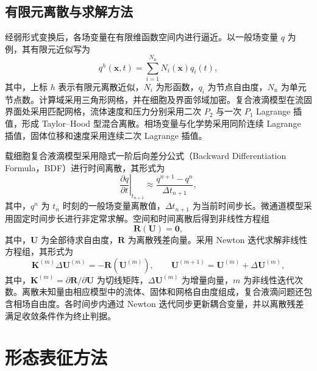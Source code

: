 \subsection{有限元离散与求解方法}
\label{subsec:ch2_discretization}

经弱形式变换后，各场变量在有限维函数空间内进行逼近。以一般场变量 $q$ 为例，其有限元近似写为
\begin{equation}
q^h(\boldsymbol{x},t)
=
\sum_{i=1}^{N_{\mathrm n}}
N_i(\boldsymbol{x})q_i(t),
\label{eq:ch2_fe_interpolation}
\end{equation}
其中，上标 $h$ 表示有限元离散近似，$N_i$ 为形函数，$q_i$ 为节点自由度，$N_{\mathrm n}$ 为单元节点数。计算域采用三角形网格，并在细胞及界面邻域加密。复合液滴模型在流固界面处采用匹配网格，流体速度和压力分别采用二次 $P_2$ 与一次 $P_1$ Lagrange 插值，形成 Taylor--Hood 型混合离散\cite{taylor1973numerical}。相场变量与化学势采用同阶连续 Lagrange 插值，固体位移和速度采用连续二次 Lagrange 插值。

载细胞复合液滴模型采用隐式一阶后向差分公式（Backward Differentiation Formula，BDF）进行时间离散\cite{ascher1998computer}，其形式为
\begin{equation}
\left.
\frac{\partial q}{\partial t}
\right|_{t_{n+1}}
\approx
\frac{q^{n+1}-q^n}{\Delta t_{n+1}},
\label{eq:ch2_bdf_first_order}
\end{equation}
其中，$q^n$ 为 $t_n$ 时刻的一般场变量离散值，$\Delta t_{n+1}$ 为当前时间步长。微通道模型采用固定时间步长进行非定常求解。空间和时间离散后得到非线性方程组
\begin{equation}
\boldsymbol{R}(\boldsymbol{U})
=
\boldsymbol{0},
\label{eq:ch2_discrete_residual}
\end{equation}
其中，$\boldsymbol{U}$ 为全部待求自由度，$\boldsymbol{R}$ 为离散残差向量。采用 Newton 迭代求解非线性方程组\cite{ypma1995historical}，其形式为
\begin{equation}
\boldsymbol{K}^{(m)}
\Delta\boldsymbol{U}^{(m)}
=
-\boldsymbol{R}\left(\boldsymbol{U}^{(m)}\right),
\qquad
\boldsymbol{U}^{(m+1)}
=
\boldsymbol{U}^{(m)}
+
\Delta\boldsymbol{U}^{(m)},
\label{eq:ch2_newton_iteration}
\end{equation}
其中，$\boldsymbol{K}^{(m)}=\partial\boldsymbol{R}/\partial\boldsymbol{U}$ 为切线矩阵，$\Delta\boldsymbol{U}^{(m)}$ 为增量向量，$m$ 为非线性迭代次数。离散未知量由相应模型中的流体、固体和网格自由度组成，复合液滴问题还包含相场自由度。各时间步内通过 Newton 迭代同步更新耦合变量，并以离散残差满足收敛条件作为终止判据。

\section{形态表征方法}
\label{sec:ch2_morphology}


